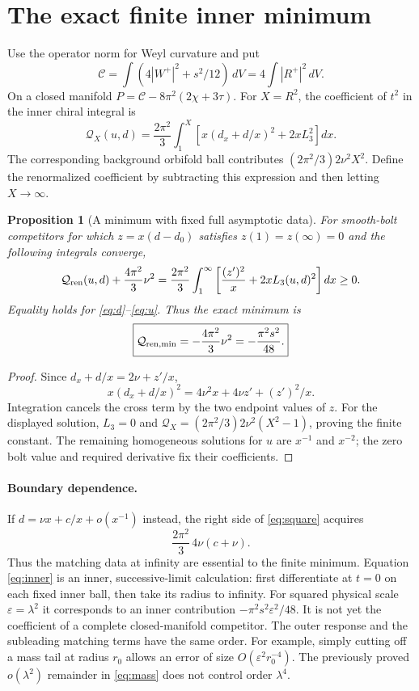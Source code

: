 \documentclass[11pt]{article}
\newtheorem{proposition}{Proposition}
\newcommand{\calC}{\mathcal C}
\begin{document}
\section{The exact finite inner minimum}
Use the operator norm for Weyl curvature and put
\[
 \calC=\int(4|W^+|^2+s^2/12)\,dV=4\int|R^+|^2\,dV.
\]
On a closed manifold $P=\calC-8\pi^2(2\chi+3\tau)$.
For $X=R^2$, the coefficient of $t^2$ in the inner chiral integral is
\[
 \mathcal Q_X(u,d)=\frac{2\pi^2}{3}
 \int_1^X\left[x(d_x+d/x)^2+2xL_3^2\right]dx.
\]
The corresponding background orbifold ball contributes
$(2\pi^2/3)2\nu^2X^2$. Define the renormalized coefficient by
subtracting this expression and then letting $X\to\infty$.

\begin{proposition}[A minimum with fixed full asymptotic data]
For smooth-bolt competitors for which
$z=x(d-d_0)$ satisfies $z(1)=z(\infty)=0$ and the following integrals
converge,
\begin{equation}
 \mathcal Q_{\rm ren}(u,d)+\frac{4\pi^2}{3}\nu^2
 =\frac{2\pi^2}{3}\int_1^\infty
       \left[\frac{(z')^2}{x}+2xL_3(u,d)^2\right]dx\ge0.
 \label{eq:square}
\end{equation}
Equality holds for \eqref{eq:d}--\eqref{eq:u}. Thus the exact minimum is
\begin{equation}
 \boxed{\mathcal Q_{\rm ren,min}=-\frac{4\pi^2}{3}\nu^2
                              =-\frac{\pi^2s^2}{48}.}
 \label{eq:inner}
\end{equation}
\end{proposition}
\begin{proof}
Since $d_x+d/x=2\nu+z'/x$,
\[
 x(d_x+d/x)^2=4\nu^2x+4\nu z'+(z')^2/x.
\]
Integration cancels the cross term by the two endpoint values of $z$.
For the displayed solution, $L_3=0$ and
$\mathcal Q_X=(2\pi^2/3)2\nu^2(X^2-1)$, proving the finite constant.
The remaining homogeneous solutions for $u$ are $x^{-1}$ and $x^{-2}$;
the zero bolt value and required derivative fix their coefficients.
\end{proof}

\paragraph{Boundary dependence.}
If $d=\nu x+c/x+o(x^{-1})$ instead, the right side of
\eqref{eq:square} acquires
\[
 \frac{2\pi^2}{3}\,4\nu(c+\nu).
\]
Thus the matching data at infinity are essential to the finite minimum.
Equation \eqref{eq:inner} is an inner, successive-limit calculation:
first differentiate at $t=0$ on each fixed inner ball, then take its
radius to infinity. For squared physical scale $\varepsilon=\lambda^2$
it corresponds to an inner contribution
$-\pi^2s^2\varepsilon^2/48$. It is not yet the coefficient of a
complete closed-manifold competitor. The outer response and the
subleading matching terms have the same order. For example, simply
cutting off a mass tail at radius $r_0$ allows an error of size
$O(\varepsilon^2r_0^{-4})$. The previously proved $o(\lambda^2)$
remainder in \eqref{eq:mass} does not control order $\lambda^4$.
\end{document}
